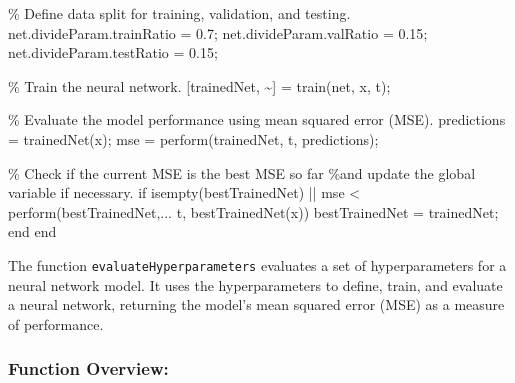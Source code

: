 \documentclass[
]{agujournal2019}
\newenvironment{Shaded}{\begin{snugshade}}{\end{snugshade}}
\newcommand{\CommentTok}[1]{\textcolor[rgb]{0.37,0.37,0.37}{#1}}
\newcommand{\FloatTok}[1]{\textcolor[rgb]{0.68,0.00,0.00}{#1}}
\newcommand{\KeywordTok}[1]{\textcolor[rgb]{0.00,0.23,0.31}{#1}}
\newcommand{\NormalTok}[1]{\textcolor[rgb]{0.00,0.23,0.31}{#1}}
\newcommand{\OperatorTok}[1]{\textcolor[rgb]{0.37,0.37,0.37}{#1}}
\newcommand{\VariableTok}[1]{\textcolor[rgb]{0.07,0.07,0.07}{#1}}
\begin{document}
\begin{Shaded}
\begin{Highlighting}[]
        \CommentTok{\% Define data split for training, validation, and testing.}
        \VariableTok{net}\NormalTok{.}\VariableTok{divideParam}\NormalTok{.}\VariableTok{trainRatio} \OperatorTok{=} \FloatTok{0.7}\OperatorTok{;}
        \VariableTok{net}\NormalTok{.}\VariableTok{divideParam}\NormalTok{.}\VariableTok{valRatio} \OperatorTok{=} \FloatTok{0.15}\OperatorTok{;}
        \VariableTok{net}\NormalTok{.}\VariableTok{divideParam}\NormalTok{.}\VariableTok{testRatio} \OperatorTok{=} \FloatTok{0.15}\OperatorTok{;}

        \CommentTok{\% Train the neural network.}
\NormalTok{        [}\VariableTok{trainedNet}\OperatorTok{,} \OperatorTok{\textasciitilde{}}\NormalTok{] }\OperatorTok{=} \VariableTok{train}\NormalTok{(}\VariableTok{net}\OperatorTok{,} \VariableTok{x}\OperatorTok{,} \VariableTok{t}\NormalTok{)}\OperatorTok{;}

        \CommentTok{\% Evaluate the model performance using mean squared error (MSE).}
        \VariableTok{predictions} \OperatorTok{=} \VariableTok{trainedNet}\NormalTok{(}\VariableTok{x}\NormalTok{)}\OperatorTok{;}
        \VariableTok{mse} \OperatorTok{=} \VariableTok{perform}\NormalTok{(}\VariableTok{trainedNet}\OperatorTok{,} \VariableTok{t}\OperatorTok{,} \VariableTok{predictions}\NormalTok{)}\OperatorTok{;}

        \CommentTok{\% Check if the current MSE is the best MSE so far }
        \CommentTok{\%and update the global variable if necessary.}
        \KeywordTok{if} \VariableTok{isempty}\NormalTok{(}\VariableTok{bestTrainedNet}\NormalTok{) }\OperatorTok{||} \VariableTok{mse} \OperatorTok{\textless{}} \VariableTok{perform}\NormalTok{(}\VariableTok{bestTrainedNet}\OperatorTok{,...}
         \VariableTok{t}\OperatorTok{,} \VariableTok{bestTrainedNet}\NormalTok{(}\VariableTok{x}\NormalTok{))}
            \VariableTok{bestTrainedNet} \OperatorTok{=} \VariableTok{trainedNet}\OperatorTok{;}
        \KeywordTok{end}
    \KeywordTok{end}
\end{Highlighting}
\end{Shaded}

The function \texttt{evaluateHyperparameters} evaluates a set of
hyperparameters for a neural network model. It uses the hyperparameters
to define, train, and evaluate a neural network, returning the model's
mean squared error (MSE) as a measure of performance.

\subsubsection{Function Overview:}\label{function-overview}
\end{document}
